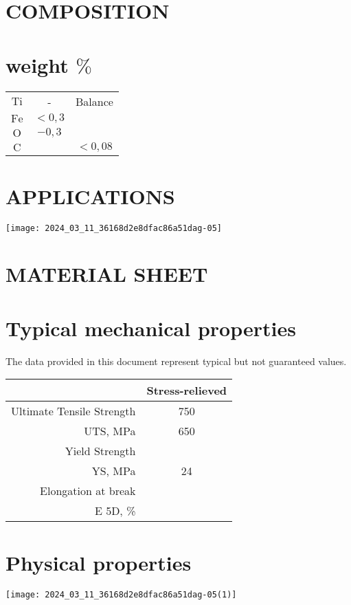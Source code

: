 \documentclass[10pt]{article}
\begin{document}
\section*{COMPOSITION}
\section*{weight $\%$}
\begin{center}
\begin{tabular}{ccc}
$\mathrm{Ti}$ & - & Balance \\
$\mathrm{Fe}$ & $<0,3$ &  \\
$\mathrm{O}$ & $-0,3$ &  \\
$\mathrm{C}$ &  & $<0,08$ \\
\end{tabular}
\end{center}

\section*{APPLICATIONS}
\begin{center}
\texttt{[image: 2024\_03\_11\_36168d2e8dfac86a51dag-05]}
\end{center}

\section*{MATERIAL SHEET}
\section*{Typical mechanical properties}
The data provided in this document represent typical but not guaranteed values.

\begin{center}
\begin{tabular}{|rc|}
\hline
 & Stress-relieved \\
\hline
Ultimate Tensile Strength & 750 \\
UTS, MPa & 650 \\
\hline
Yield Strength &  \\
YS, MPa & 24 \\
\hline
Elongation at break &  \\
E 5D, \% &  \\
\hline
\end{tabular}
\end{center}

\section*{Physical properties}
\begin{center}
\texttt{[image: 2024\_03\_11\_36168d2e8dfac86a51dag-05(1)]}
\end{center}
\end{document}
